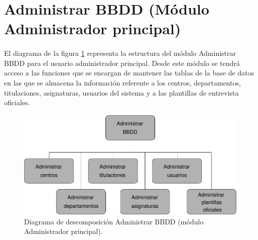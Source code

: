 \section{Administrar BBDD (Módulo Administrador principal)}

  \paragraph{}El diagrama de la figura
  \ref{diagramaDescomposicionAdministrarBBDD} representa la estructura del
  módulo Administrar BBDD para el usuario administrador principal. Desde este
  módulo se tendrá acceso a las funciones que se encargan de mantener las tablas
  de la base de datos en las que se almacena la información referente a los
  centros, departamentos, titulaciones, asignaturas, usuarios del sistema y
  a las plantillas de entrevista oficiales.

  \begin{figure}[!ht]
    \begin{center}
      \includegraphics[]{11.Disenyo_Arquitectonico/11.2.Diagramas_Descomposicion/11.2.2.Modulo_administrador_principal/AdministrarBBDD/Diagramas/administrar_bbdd.pdf}
      \caption{Diagrama de descomposición Administrar BBDD (módulo Administrador principal).}
      \label{diagramaDescomposicionAdministrarBBDD}
    \end{center}
  \end{figure}

